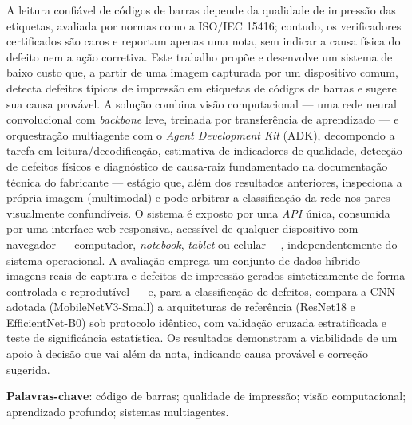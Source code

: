 \documentclass[
	article,			%
	11pt,				%
	oneside,			%
	a4paper,			%
	english,			%
	brazilian,			%
	sumario=tradicional
	]{abntex2}
\begin{document}
\frenchspacing

\maketitle

\begin{resumoumacoluna}
A leitura confiável de códigos de barras depende da qualidade de impressão das
etiquetas, avaliada por normas como a ISO/IEC 15416; contudo, os verificadores
certificados são caros e reportam apenas uma nota, sem indicar a causa física
do defeito nem a ação corretiva. Este trabalho propõe e desenvolve um sistema de
baixo custo que, a partir de uma imagem capturada por um dispositivo comum,
detecta defeitos típicos de impressão em etiquetas de códigos de barras e sugere
sua causa provável. A solução combina visão computacional --- uma rede neural
convolucional com \textit{backbone} leve, treinada por transferência de
aprendizado --- e orquestração multiagente com o \textit{Agent Development Kit}
(ADK), decompondo a tarefa em leitura/decodificação, estimativa de indicadores de
qualidade, detecção de defeitos físicos e diagnóstico de causa-raiz fundamentado
na documentação técnica do fabricante --- estágio que, além dos resultados
anteriores, inspeciona a própria imagem (multimodal) e pode arbitrar a
classificação da rede nos pares visualmente confundíveis. O sistema é exposto por uma \textit{API}
única, consumida por uma interface web responsiva, acessível de qualquer
dispositivo com navegador --- computador, \textit{notebook}, \textit{tablet} ou
celular ---, independentemente do sistema operacional. A avaliação emprega um
conjunto de dados híbrido --- imagens reais de captura e defeitos de impressão
gerados sinteticamente de forma controlada e reprodutível --- e, para a
classificação de defeitos, compara a CNN adotada (MobileNetV3-Small) a
arquiteturas de referência (ResNet18 e EfficientNet-B0) sob protocolo idêntico,
com validação cruzada estratificada e teste de significância estatística. Os
resultados demonstram a viabilidade de um apoio à decisão que vai além da nota,
indicando causa provável e correção sugerida.

\noindent
\textbf{Palavras-chave}: código de barras; qualidade de impressão; visão
computacional; aprendizado profundo; sistemas multiagentes.
\end{resumoumacoluna}
\end{document}
